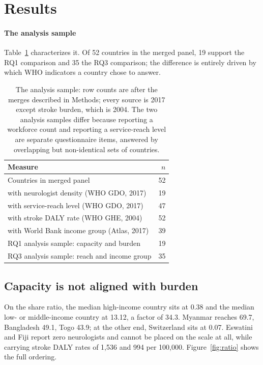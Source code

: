 \documentclass[9pt,twoside]{pnas-new}
\begin{document}
\section*{Results}

\paragraph{The analysis sample} Table~\ref{tab:sample} characterizes it. Of 52
countries in the merged panel, 19 support the RQ1 comparison and 35 the RQ3
comparison; the difference is entirely driven by which WHO indicators a country
chose to answer.

\begin{table}[!ht]
\centering
\caption{The analysis sample: row counts are after the merges described in
Methods; every source is 2017 except stroke burden, which is 2004. The two
analysis samples differ because reporting a workforce count and reporting a
service-reach level are separate questionnaire items, answered by overlapping
but non-identical sets of countries.}
\label{tab:sample}
\begin{tabular}{lr}
\toprule
Measure & $n$ \\
\midrule
Countries in merged panel & 52 \\
\quad with neurologist density (WHO GDO, 2017) & 19 \\
\quad with service-reach level (WHO GDO, 2017) & 47 \\
\quad with stroke DALY rate (WHO GHE, 2004) & 52 \\
\quad with World Bank income group (Atlas, 2017) & 39 \\
\midrule
RQ1 analysis sample: capacity and burden & 19 \\
RQ3 analysis sample: reach and income group & 35 \\
\bottomrule
\end{tabular}

\end{table}
\FloatBarrier

\subsection*{Capacity is not aligned with burden}

On the share ratio, the median high-income country sits at 0.38 and the
median low- or middle-income country at 13.12, a factor of
34.3. Myanmar reaches 69.7, Bangladesh 49.1, Togo 43.9; at the other
end, Switzerland sits at 0.07. Eswatini and Fiji report zero neurologists
and cannot be placed on the scale at all, while carrying stroke DALY rates of
1{,}536 and 994 per 100{,}000. Figure~\ref{fig:ratio} shows the full ordering.
\end{document}
